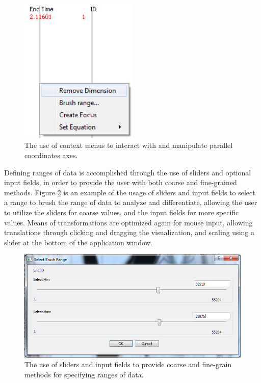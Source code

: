 \documentclass[12pt]{ucthesis}
\begin{document}
\begin{figure}[h!]
 \centering
 \includegraphics[width=0.5\textwidth]{images/context_menu.jpg}
 \caption[Context menus to interact with and manipulate axes.]{The use of context menus to interact with and manipulate parallel coordinates axes.}
 \label{fig:context_menus}
\end{figure}

Defining ranges of data is accomplished through the use of sliders and optional input fields, in order to provide the user with both coarse and fine-grained methods. Figure \ref{fig:sliders_input} is an example of the usage of sliders and input fields to select a range to brush the range of data to analyze and differentiate, allowing the user to utilize the sliders for coarse values, and the input fields for more specific values. Means of transformations are optimized again for mouse input, allowing translations through clicking and dragging the visualization, and scaling using a slider at the bottom of the application window.

\begin{figure}[h!]
 \centering
 \includegraphics[width=\textwidth]{images/select_range.jpg}
 \caption[Sliders and input fields for specifying ranges of data.]{The use of sliders and input fields to provide coarse and fine-grain methods for specifying ranges of data.}
 \label{fig:sliders_input}
\end{figure}
\end{document}
